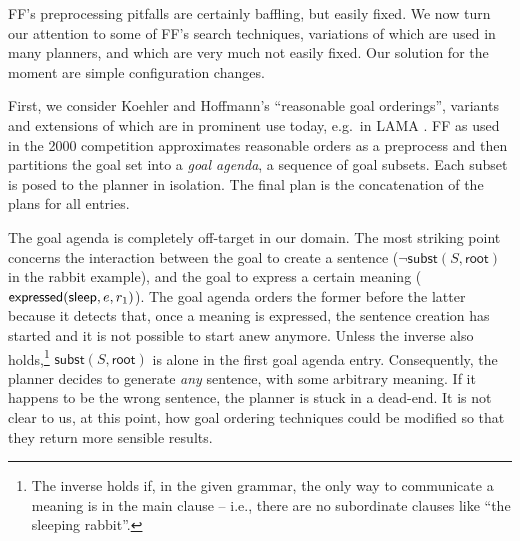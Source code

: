 FF's preprocessing pitfalls are certainly baffling, but easily
fixed. We now turn our attention to some of FF's search techniques,
variations of which are used in many planners, and which are very much
not easily fixed. Our solution for the moment are simple configuration
changes. %




First, we consider Koehler and Hoffmann's
 ``reasonable goal orderings'',
variants and extensions of which are in prominent use today, e.g.\ in
LAMA \cite{richter:etal:aaai-08}. FF as used in the 2000 competition
approximates reasonable orders as a preprocess and then partitions the
goal set into a {\em goal agenda}, a sequence of goal subsets. Each
subset is posed to the planner in isolation. The final plan is the
concatenation of the plans for all entries.


The goal agenda is completely off-target in our domain. The most
striking point concerns the interaction between the goal to create a
sentence ($\neg \mathsf{subst}(S,\mathsf{root})$ in the rabbit
example), and the goal to express a certain meaning
($\mathsf{expressed}(\mathsf{sleep},e,r_1)$). The goal agenda orders the former
before the latter because it detects that, once a meaning is
expressed, the sentence creation has started and it is not possible to
start anew anymore. Unless the inverse also holds,\footnote{The
  inverse holds if, in the given grammar, the only way to communicate
  a meaning is in the main clause -- i.e., there are no subordinate
  clauses like ``the sleeping rabbit''.}
$\mathsf{subst}(S,\mathsf{root})$ is alone in the first goal agenda
entry. Consequently, the planner decides to generate {\em any}
sentence, with some arbitrary meaning. If it happens to be the wrong
sentence, the planner is stuck in a dead-end. %
It is not clear to us, at this point, how goal ordering techniques
could be modified so that they return more sensible results.

